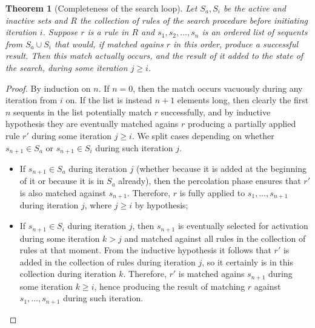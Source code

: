 \documentclass{article}
\newtheorem{theorem}{Theorem}
\begin{document}
\begin{theorem}[Completeness of the search loop]
  Let $S_a, S_i$ be the active and inactive sets and $R$ the collection of rules
  of the search procedure before initiating iteration $i$. Suppose $r$ is a rule
  in $R$ and $s_1, s_2, \dots, s_n$ is an ordered list of sequents from
  $S_a \cup S_i$ that would, if matched agains $r$ in this order, produce a
  successful result. Then this match actually occurs, and the result of it added
  to the state of the search, during some iteration $j \geq i$.
\end{theorem}
\begin{proof}
  By induction on $n$. If $n = 0$, then the match occurs vacuously during any
  iteration from $i$ on. If the list is instead $n+1$ elements long, then
  clearly the first $n$ sequents in the list potentially match $r$ successfully,
  and by inductive hypothesis they are eventually matched agains $r$ producing a
  partially applied rule $r'$ during some iteration $j \geq i$. We split cases
  depending on whether $s_{n+1} \in S_a$ or $s_{n+1} \in S_i$ during such
  iteration $j$.

  \begin{itemize}
  \item If $s_{n+1} \in S_a$ during iteration $j$ (whether because it is added
    at the beginning of it or because it is in $S_a$ already), then the
    percolation phase ensures that $r'$ is also matched against
    $s_{n+1}$. Therefore, $r$ is fully applied to $s_1, \dots, s_{n+1}$ during
    iteration $j$, where $j \geq i$ by hypothesis;
    
  \item If $s_{n+1} \in S_i$ during iteration $j$, then $s_{n+1}$ is eventually
    selected for activation during some iteration $k > j$ and matched against
    all rules in the collection of rules at that moment. From the inductive
    hypothesis it follows that $r'$ is added in the collection of rules during
    iteration $j$, so it certainly is in this collection during iteration
    $k$. Therefore, $r'$ is matched agains $s_{n+1}$ during some iteration
    $k \geq i$, hence producing the result of matching $r$ against
    $s_1, \dots, s_{n+1}$ during such iteration.
  \end{itemize}
\end{proof}
\end{document}
